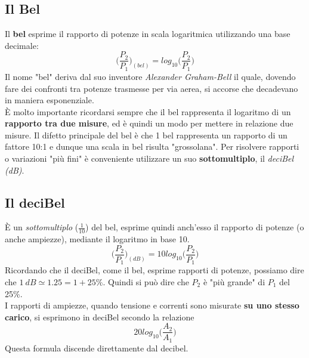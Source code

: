 \documentclass[a4paper,11pt]{report}
\begin{document}
\subsection{Il Bel}
Il \textbf{bel} esprime il rapporto di potenze in scala logaritmica utilizzando una base decimale: $$\Bigg(\frac{P_{2}}{P_{1}}\Bigg)_{(bel)} = log_{10}\Bigg(\frac{P_{2}}{P_{1}}\Bigg)$$
Il nome "bel" deriva dal suo inventore \textit{Alexander Graham-Bell} il quale, dovendo fare dei confronti tra potenze trasmesse per via aerea, si accorse che decadevano in maniera esponenziale.\\
È molto importante ricordarsi sempre che il bel rappresenta il logaritmo di un \textbf{rapporto tra due misure}, ed è quindi un modo per mettere in relazione due misure. Il difetto principale del bel è che 1 bel rappresenta un rapporto di un fattore 10:1 e dunque una scala in bel risulta "grossolana". Per risolvere\footnotemark {} rapporti o variazioni "più fini" è conveniente utilizzare un suo \textbf{sottomultiplo}, il \textit{deciBel (dB)}.
\subsection{Il deciBel}
È un \textit{sottomultiplo} ($\frac{1}{10}$) del bel, esprime quindi anch'esso il rapporto di potenze (o anche ampiezze), mediante il logaritmo in base 10. $$\Bigg(\frac{P_{2}}{P_{1}}\Bigg)_{(dB)} = 10log_{10}\Bigg(\frac{P_{2}}{P_{1}}\Bigg)$$
Ricordando che il deciBel, come il bel, esprime rapporti di potenze, possiamo dire che $ 1\ dB \simeq 1.25 = 1 + 25\% $. Quindi si può dire che $P_{2}$ è "più grande" di $P_{1}$ del 25\%.\\
I rapporti di ampiezze, quando tensione e correnti sono misurate \textbf{su uno stesso carico}, si esprimono in deciBel secondo la relazione $$ 20log_{10}\Bigg(\frac{A_{2}}{A_{1}}\Bigg) $$
Questa formula discende direttamente dal decibel.
\end{document}
